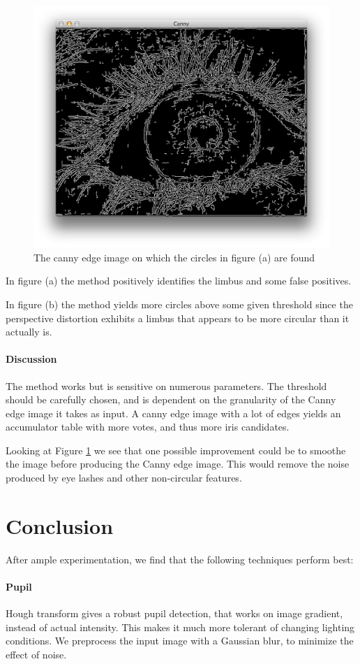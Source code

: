 \documentclass[a4paper,11pt]{article}
\begin{document}
\begin{figure}[H]
\centering
  \includegraphics[width=.8\linewidth]{houghcanny}
  \caption{The canny edge image on which the circles in figure (a) are found}
  \label{fig:canny}
\end{figure}
In figure (a) the method positively identifies the limbus and some false positives.

In figure (b) the method yields more circles above some given threshold since the perspective distortion exhibits a limbus that appears to be more circular than it actually is.

\paragraph{Discussion} %
\label{par:discussion}
The method works but is sensitive on numerous parameters. The threshold should be carefully chosen, and is dependent on the granularity of the Canny edge image it takes as input. A canny edge image with a lot of edges yields an accumulator table with more votes, and thus more iris candidates.

Looking at Figure \ref{fig:canny} we see that one possible improvement could be to smoothe the image before producing the Canny edge image. This would remove the noise produced by eye lashes and other non-circular features.

\section{Conclusion}
After ample experimentation, we find that the following techniques perform best:
\paragraph{Pupil}
Hough transform gives a robust pupil detection, that works on image gradient, instead of actual intensity. This makes it much more tolerant of changing lighting conditions. We preprocess the input image with a Gaussian blur, to minimize the effect of noise.
\end{document}
